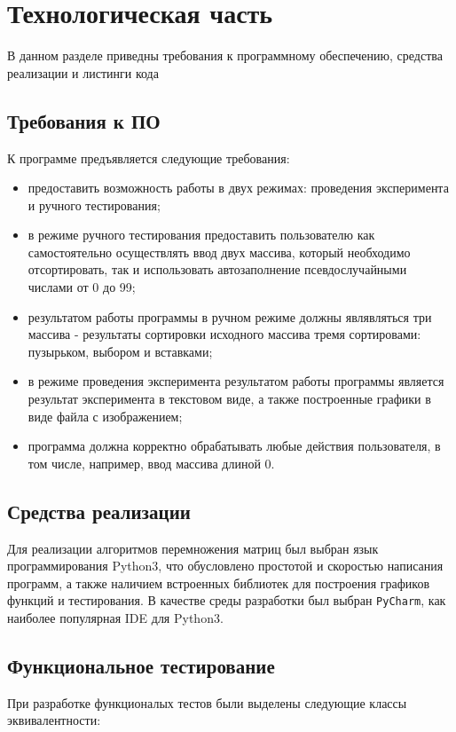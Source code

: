\chapter{Технологическая часть}
В данном разделе приведны требования к программному обеспечению, средства реализации и листинги кода
\section{Требования к ПО}
К программе предъявляется следующие требования:
\begin{itemize}
    \item предоставить возможность работы в двух режимах: проведения эксперимента и ручного тестирования;
    \item в режиме ручного тестирования предоставить пользователю как самостоятельно осуществлять ввод двух 
    массива, который необходимо отсортировать, так и использовать автозаполнение псевдослучайными числами от 0 до 99;
	\item результатом работы программы в ручном режиме должны являвляться три массива - результаты сортировки исходного
    массива тремя сортировами: пузырьком, выбором и вставками;
    \item в режиме проведения эксперимента результатом работы программы является результат эксперимента в текстовом виде,
    а также построенные графики в виде файла с изображением;
    \item программа должна корректно обрабатывать любые действия пользователя, в том числе, например, ввод массива длиной 0.
\end{itemize}

\section{Средства реализации}
Для реализации алгоритмов перемножения матриц был выбран язык программирования Python3\cite{python}, что обусловлено простотой 
и скоростью написания программ, а также наличием встроенных библиотек для построения графиков функций и тестирования. 
В качестве среды разработки был выбран \texttt{PyCharm}\cite{pycharm}, как наиболее популярная IDE для Python3. 

\section{Функциональное тестирование}

При разработке функционалых тестов были выделены следующие классы эквивалентности:


